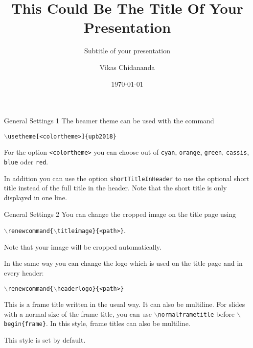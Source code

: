 \documentclass[
		aspectratio=169
	] {beamer}
\title[SHORTTITLE]{This Could Be The Title Of Your Presentation}
\subtitle{Subtitle of your presentation}
\institute{PADERBORN UNIVERSITY} %
\author{Vikas Chidananda}
\date{\today}
\begin{document}
\begin{frame}[plain]
	\titlepage
\end{frame}



\begin{frame}{General Settings 1}
	The beamer theme  can be used with the command 
	\begin{center}
		\texttt{$\backslash$usetheme[<colortheme>]\{upb2018\}}
	\end{center}

	For the option \texttt{<colortheme>} you can choose out of
	\texttt{cyan}, \texttt{orange}, \texttt{green}, \texttt{cassis}, \texttt{blue} oder
	\texttt{red}.

	In addition you can use the option \texttt{shortTitleInHeader} to
	use the optional short title instead of the full title in the header. Note that
	the short title is only displayed in one line.
\end{frame}



\begin{frame}{General Settings 2}
	You can change the cropped image on the title page using

	\begin{center}
		\texttt{$\backslash$renewcommand\{$\backslash$titleimage\}\{<path>\}}.
	\end{center}

	Note that your image will be cropped automatically.

	\vfill

	In the same way you can change the logo which is used on the title page and
	in every header:
	\begin{center}
		\texttt{$\backslash$renewcommand\{$\backslash$headerlogo\}\{<path>\}}
	\end{center}
\end{frame}



\normalframetitle %
\begin{frame}{This is a frame title written in the usual way. It can also
be multiline.}
	For slides with a normal size of the frame title, you can use \texttt{$\backslash$normalframetitle}
	before \texttt{$\backslash$begin\{frame\}}. In this style, frame titles can
	also be multiline.

	This style is set by default.
\end{frame}
\end{document}
